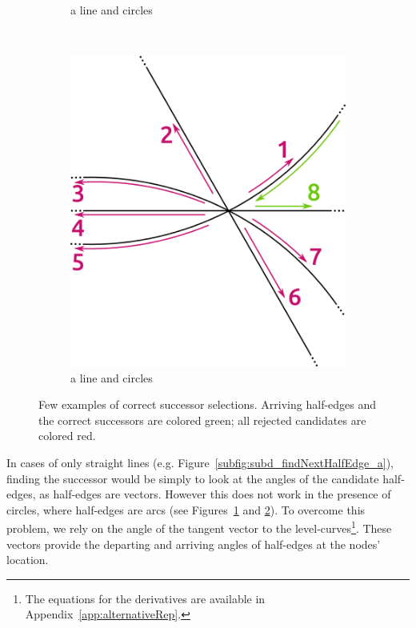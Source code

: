 \begin{figure}
\begin{subfigure}{.32\textwidth}
    \caption{a line and circles} \label{subfig:subd_findNextHalfEdge_b}
  \end{subfigure}%
  ~%
  \begin{subfigure}{.32\textwidth}
    \includegraphics[width=\textwidth]{figures/subd_findNextHalfEdge_c.png}
    \caption{a line and circles} \label{subfig:subd_findNextHalfEdge_c}
  \end{subfigure}%
  \caption[xxx]
          {Few examples of correct successor selections.
            Arriving half-edges and the correct successors are colored green; all rejected candidates are colored red.}
  \label{fig:subd_findNextHalfEdge}
\end{figure}

In cases of only straight lines (e.g. Figure~\ref{subfig:subd_findNextHalfEdge_a}), finding the successor would be simply to look at the angles of the candidate half-edges, as half-edges are vectors.
However this does not work in the presence of circles, where half-edges are arcs (see Figures~\ref{subfig:subd_findNextHalfEdge_b} and \ref{subfig:subd_findNextHalfEdge_c}).
To overcome this problem, we rely on the angle of the tangent vector to the level-curves\footnote{The equations for the derivatives are available in Appendix~\ref{app:alternativeRep}.}.
These vectors provide the departing and arriving angles of half-edges at the nodes' location.


